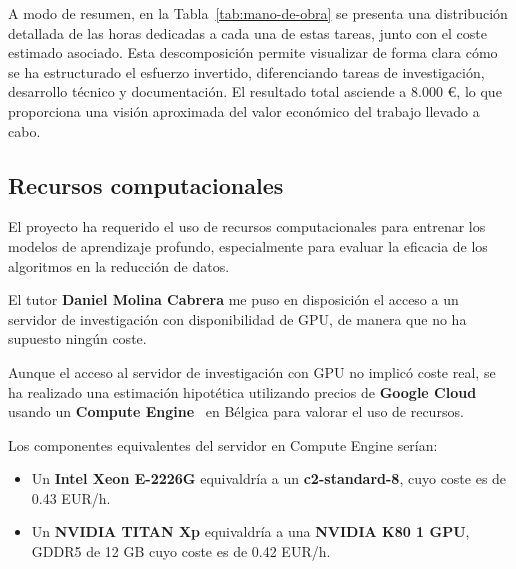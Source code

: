 A modo de resumen, en la Tabla~\ref{tab:mano-de-obra} se presenta una distribución detallada de las horas dedicadas a cada una de estas tareas, 
junto con el coste estimado asociado. 
Esta descomposición permite visualizar de forma clara cómo se ha estructurado el esfuerzo invertido, diferenciando tareas de investigación, desarrollo técnico y documentación. 
El resultado total asciende a 8.000 €, lo que proporciona una visión aproximada del valor económico del trabajo llevado a cabo.

\subsection{Recursos computacionales}\label{subsec:recursos-computacionales}
El proyecto ha requerido el uso de recursos computacionales para entrenar los modelos de aprendizaje profundo,
especialmente para evaluar la eficacia de los algoritmos en la reducción de datos.


El tutor \textbf{Daniel Molina Cabrera} me puso en disposición el acceso a un servidor de investigación con
disponibilidad de GPU, de manera que no ha supuesto ningún coste.


Aunque el acceso al servidor de investigación con GPU no implicó coste real,
se ha realizado una estimación hipotética utilizando precios de \textbf{Google Cloud}~\cite{OverviewGoogleCloud}
usando un \textbf{Compute Engine}~\cite{WhatCloudRun} en Bélgica para valorar el uso de recursos.


Los componentes equivalentes del servidor en Compute Engine serían:
\begin{itemize}
    \item Un \textbf{Intel Xeon E-2226G} equivaldría a un \textbf{c2-standard-8}, cuyo coste es de 0.43 EUR/h.
    \item Un \textbf{NVIDIA TITAN Xp} equivaldría a una \textbf{NVIDIA K80 1 GPU}, GDDR5 de 12 GB cuyo coste es de 0.42
          EUR/h.
\end{itemize}

